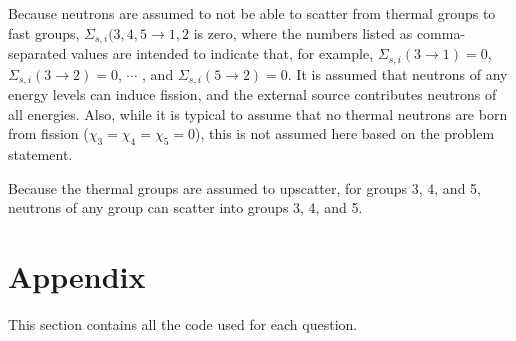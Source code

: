 \documentclass[10pt]{article}
\begin{document}
Because neutrons are assumed to not be able to scatter from thermal groups to fast groups, \(\Sigma_{s,i}(3,4,5\rightarrow 1,2\) is zero, where the numbers listed as comma-separated values are intended to indicate that, for example, \(\Sigma_{s,i}(3\rightarrow 1)=0\), \(\Sigma_{s,i}(3\rightarrow 2)=0\), \(\cdots\) , and \(\Sigma_{s,i}(5\rightarrow2)=0\). It is assumed that neutrons of any energy levels can induce fission, and the external source contributes neutrons of all energies. Also, while it is typical to assume that no thermal neutrons are born from fission (\(\chi_3=\chi_4=\chi_5=0\)), this is not assumed here based on the problem statement.

Because the thermal groups are assumed to upscatter, for groups 3, 4, and 5, neutrons of any group can scatter into groups 3, 4, and 5.

\section{Appendix}
This section contains all the code used for each question. 

%
\end{document}

